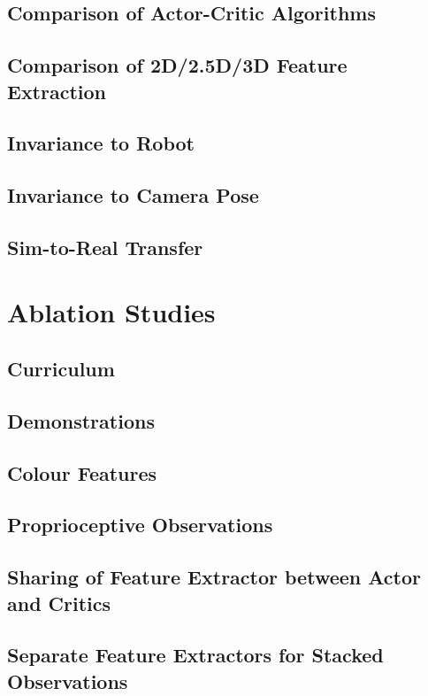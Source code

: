 \subsection{Comparison of Actor-Critic Algorithms}

\subsection{Comparison of 2D/2.5D/3D Feature Extraction}

\subsection{Invariance to Robot}

\subsection{Invariance to Camera Pose}

\subsection{Sim-to-Real Transfer}



\section{Ablation Studies}

\subsection{Curriculum}

\subsection{Demonstrations}

\subsection{Colour Features}

\subsection{Proprioceptive Observations}

\subsection{Sharing of Feature Extractor between Actor and Critics}

\subsection{Separate Feature Extractors for Stacked Observations}

